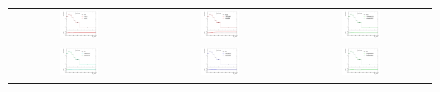 \begin{figure}[!tpb]
\begin{center}
  \def\arraystretch{0.01}
  \begin{tabular}{ccc}
\includegraphics[width=0.30\textwidth]{Modeling/Figures/topPt/topPt_bjes} & %
\includegraphics[width=0.30\textwidth]{Modeling/Figures/topPt/topPt_btageff} & %
\includegraphics[width=0.30\textwidth]{Modeling/Figures/topPt/topPt_closebyjes} \\ 
\includegraphics[width=0.30\textwidth]{Modeling/Figures/topPt/topPt_effdetset1jes} & %
\includegraphics[width=0.30\textwidth]{Modeling/Figures/topPt/topPt_etacalibjes} & %
\includegraphics[width=0.30\textwidth]{Modeling/Figures/topPt/topPt_fragment} \\ 

\end{tabular}
\end{center}
\end{figure}
